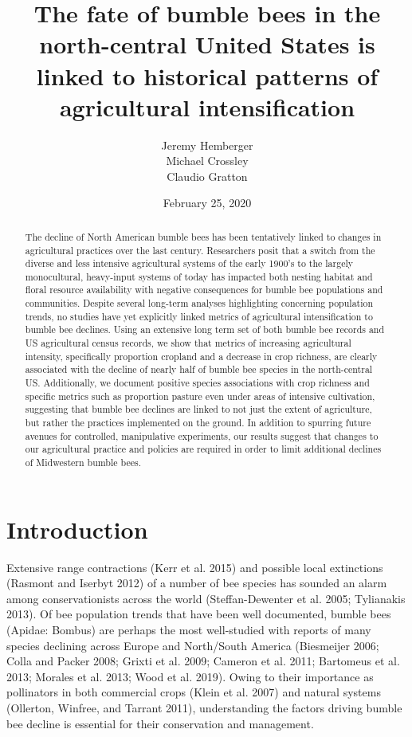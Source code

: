 \documentclass[11pt,]{article}
\title{\textbf{The fate of bumble bees in the north-central United States is
linked to historical patterns of agricultural intensification}}
\author{Jeremy Hemberger \\ Michael Crossley \\ Claudio Gratton}
\date{February 25, 2020}
\begin{document}
\maketitle
\begin{abstract}
The decline of North American bumble bees has been tentatively linked to
changes in agricultural practices over the last century. Researchers
posit that a switch from the diverse and less intensive agricultural
systems of the early 1900's to the largely monocultural, heavy-input
systems of today has impacted both nesting habitat and floral resource
availability with negative consequences for bumble bee populations and
communities. Despite several long-term analyses highlighting concerning
population trends, no studies have yet explicitly linked metrics of
agricultural intensification to bumble bee declines. Using an extensive
long term set of both bumble bee records and US agricultural census
records, we show that metrics of increasing agricultural intensity,
specifically proportion cropland and a decrease in crop richness, are
clearly associated with the decline of nearly half of bumble bee species
in the north-central US. Additionally, we document positive species
associations with crop richness and specific metrics such as proportion
pasture even under areas of intensive cultivation, suggesting that
bumble bee declines are linked to not just the extent of agriculture,
but rather the practices implemented on the ground. In addition to
spurring future avenues for controlled, manipulative experiments, our
results suggest that changes to our agricultural practice and policies
are required in order to limit additional declines of Midwestern bumble
bees.
\end{abstract}

\captionsetup[table]{labelformat=empty}

\hypertarget{introduction}{%
\section{Introduction}\label{introduction}}

Extensive range contractions (Kerr et al. 2015) and possible local
extinctions (Rasmont and Iserbyt 2012) of a number of bee species has
sounded an alarm among conservationists across the world
(Steffan-Dewenter et al. 2005; Tylianakis 2013). Of bee population
trends that have been well documented, bumble bees (Apidae: Bombus) are
perhaps the most well-studied with reports of many species declining
across Europe and North/South America (Biesmeijer 2006; Colla and Packer
2008; Grixti et al. 2009; Cameron et al. 2011; Bartomeus et al. 2013;
Morales et al. 2013; Wood et al. 2019). Owing to their importance as
pollinators in both commercial crops (Klein et al. 2007) and natural
systems (Ollerton, Winfree, and Tarrant 2011), understanding the factors
driving bumble bee decline is essential for their conservation and
management.
\end{document}
